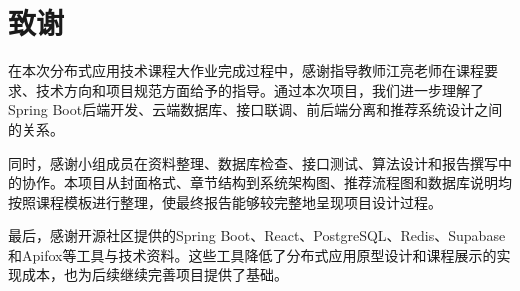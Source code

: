 
\chapter*{致谢}

在本次分布式应用技术课程大作业完成过程中，感谢指导教师江亮老师在课程要求、技术方向和项目规范方面给予的指导。通过本次项目，我们进一步理解了Spring Boot后端开发、云端数据库、接口联调、前后端分离和推荐系统设计之间的关系。

同时，感谢小组成员在资料整理、数据库检查、接口测试、算法设计和报告撰写中的协作。本项目从封面格式、章节结构到系统架构图、推荐流程图和数据库说明均按照课程模板进行整理，使最终报告能够较完整地呈现项目设计过程。

最后，感谢开源社区提供的Spring Boot、React、PostgreSQL、Redis、Supabase和Apifox等工具与技术资料。这些工具降低了分布式应用原型设计和课程展示的实现成本，也为后续继续完善项目提供了基础。
